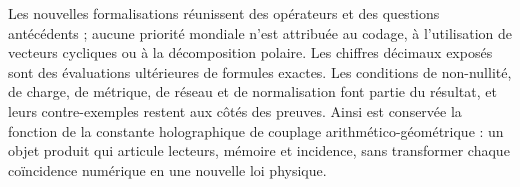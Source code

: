 Les nouvelles formalisations réunissent des opérateurs et des questions antécédents ;
aucune priorité mondiale n’est attribuée au codage, à l’utilisation de
vecteurs cycliques ou à la décomposition polaire. Les chiffres décimaux
exposés sont des évaluations ultérieures de formules exactes. Les
conditions de non-nullité, de charge, de métrique, de réseau et de normalisation font partie
du résultat, et leurs contre-exemples restent aux côtés des preuves.
Ainsi est conservée la fonction de la constante holographique de couplage
arithmético-géométrique : un objet produit qui articule lecteurs, mémoire
et incidence, sans transformer chaque coïncidence numérique en une nouvelle loi
physique.
